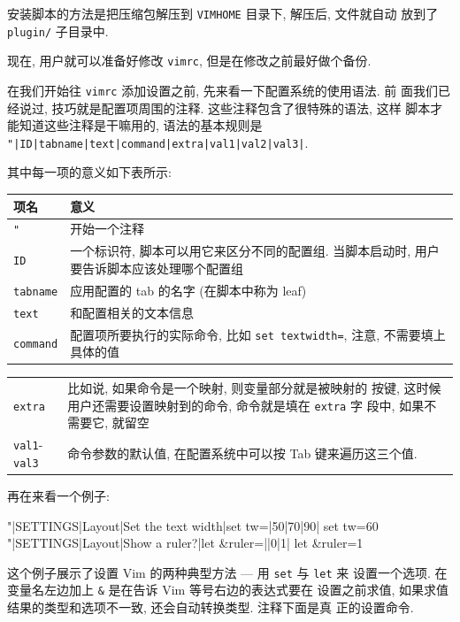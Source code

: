 安装脚本的方法是把压缩包解压到 \texttt{VIMHOME} 目录下, 解压后, 文件就自动
放到了 \texttt{plugin/} 子目录中.

现在, 用户就可以准备好修改 \texttt{vimrc}, 但是在修改之前最好做个备份.

在我们开始往 \texttt{vimrc} 添加设置之前, 先来看一下配置系统的使用语法. 前
面我们已经说过, 技巧就是配置项周围的注释. 这些注释包含了很特殊的语法, 这样
脚本才能知道这些注释是干嘛用的, 语法的基本规则是
\texttt{"|ID|tabname|text|command|extra|val1|val2|val3|}.

其中每一项的意义如下表所示:
\begin{center}
  \begin{tabular}{lp{30em}}
  \hline
  项名 & 意义 \\
  \hline
   \texttt{"}	& 开始一个注释 \\
   \texttt{ID}	& 一个标识符, 脚本可以用它来区分不同的配置组. 当脚本启动时,
     用户要告诉脚本应该处理哪个配置组 \\
   \texttt{tabname} & 应用配置的 tab 的名字 (在脚本中称为 leaf) \\
   \texttt{text} & 和配置相关的文本信息 \\
   \texttt{command} & 配置项所要执行的实际命令, 比如 \texttt{set textwidth=},
     注意, 不需要填上具体的值 \\
	\hline
  \end{tabular}
\end{center}
\begin{center}
	\begin{tabular}{lp{30em}}
	\hline
	  \texttt{extra} & 比如说, 如果命令是一个映射, 则变量部分就是被映射的
	  按键, 这时候用户还需要设置映射到的命令, 命令就是填在 \texttt{extra} 字
	  段中, 如果不需要它, 就留空 \\

	  \texttt{val1}-\texttt{val3} & 命令参数的默认值, 在配置系统中可以按
	  Tab 键来遍历这三个值. \\
	\hline
	\end{tabular}
\end{center}

再在来看一个例子:
\begin{vimcode}
"|SETTINGS|Layout|Set the text width|set tw=|50|70|90|
set tw=60
"|SETTINGS|Layout|Show a ruler?|let &ruler=||0|1|
let &ruler=1
\end{vimcode}
这个例子展示了设置 Vim 的两种典型方法 --- 用 \texttt{set} 与 \texttt{let} 来
设置一个选项. 在变量名左边加上 \texttt{\&} 是在告诉 Vim 等号右边的表达式要在
设置之前求值, 如果求值结果的类型和选项不一致, 还会自动转换类型. 注释下面是真
正的设置命令.

